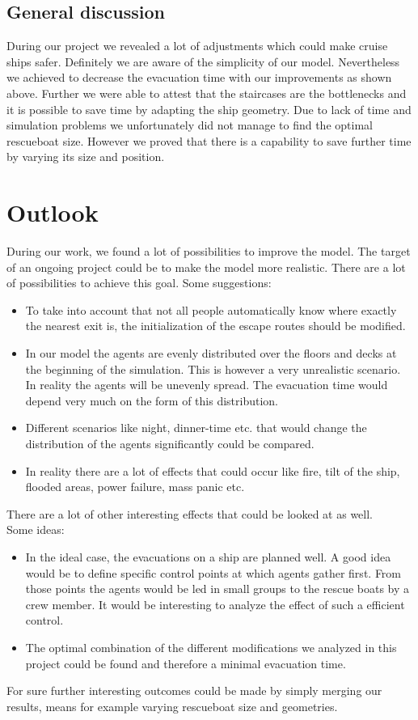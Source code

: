 \documentclass[11pt]{article}
\begin{document}
\subsection{General discussion}

During our project we revealed a lot of adjustments which could make cruise ships safer. Definitely we are aware of the simplicity of our model. Nevertheless we achieved to decrease the evacuation time with our improvements as shown above. Further we were able to attest that the staircases are the bottlenecks and it is possible to save time by adapting the ship geometry. Due to lack of time and simulation problems we unfortunately did not manage to find the optimal rescueboat size. However we proved that there is a capability to save further time by varying its size and position.


\section{Outlook}
During our work, we found a lot of possibilities to improve the model. The target of an ongoing project could be to make the model more realistic. There are a lot of possibilities to achieve this goal.
\newline
Some suggestions:
\begin{itemize}
\item To take into account that not all people automatically know where exactly the nearest exit is, the initialization of the escape routes should be modified.
\item In our model the agents are evenly distributed over the floors and decks at the beginning of the simulation. This is however a very unrealistic scenario. In reality the agents will be unevenly spread. The evacuation time would depend very much on the form of this distribution.
\item Different scenarios like night, dinner-time etc. that would change the distribution of the agents significantly could be compared.
\item In reality there are a lot of effects that could occur like fire, tilt of the ship, flooded areas, power failure, mass panic etc.
\end{itemize}
There are a lot of other interesting effects that could be looked at as well.
\\
Some ideas:
\begin{itemize}
\item In the ideal case, the evacuations on a ship are planned well. A good idea would be to define specific control points at which agents gather first. From those points the agents would be led in small groups to the rescue boats by a crew member. It would be interesting to analyze the effect of such a efficient control.
\item The optimal combination of the different modifications we analyzed in this project could be found and therefore a minimal evacuation time.
\end{itemize}
For sure further interesting outcomes could be made by simply merging our results, means for example varying rescueboat size and geometries.
\end{document}
